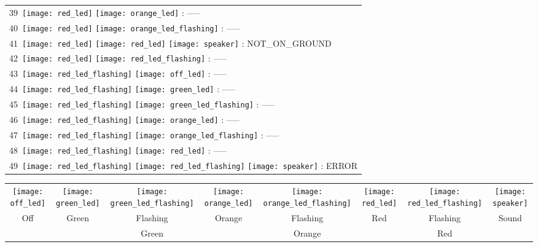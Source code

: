 \documentclass[12pt, a4paper]{report}
\begin{document}
\begin{minipage}{0.45\textwidth}
\begin{Large}
\begin{tabular}{l}
		39\  \texttt{[image: red\_led]} \texttt{[image: orange\_led]} : -----\\
		
		40\  \texttt{[image: red\_led]} \texttt{[image: orange\_led\_flashing]} : -----\\
		
		41\  \texttt{[image: red\_led]} \texttt{[image: red\_led]} \texttt{[image: speaker]} : NOT\_ON\_GROUND\\
		
		42\  \texttt{[image: red\_led]} \texttt{[image: red\_led\_flashing]} : -----\\
		
		43\  \texttt{[image: red\_led\_flashing]} \texttt{[image: off\_led]} : -----\\
		
		44\  \texttt{[image: red\_led\_flashing]} \texttt{[image: green\_led]} : -----\\
		
		45\  \texttt{[image: red\_led\_flashing]} \texttt{[image: green\_led\_flashing]} : -----\\
	
		46\  \texttt{[image: red\_led\_flashing]} \texttt{[image: orange\_led]} : -----\\
		
		47\  \texttt{[image: red\_led\_flashing]} \texttt{[image: orange\_led\_flashing]} : -----\\
		
		48\  \texttt{[image: red\_led\_flashing]} \texttt{[image: red\_led]} : -----\\
		
		49\  \texttt{[image: red\_led\_flashing]} \texttt{[image: red\_led\_flashing]} \texttt{[image: speaker]} : ERROR\\
	\end{tabular}
	\end{Large}
	\end{minipage}%

\vspace{1cm}

\begin{tabular}{c c c c c c c c}
	\texttt{[image: off\_led]} & \texttt{[image: green\_led]} & \texttt{[image: green\_led\_flashing]} & \texttt{[image: orange\_led]} & \texttt{[image: orange\_led\_flashing]} & \texttt{[image: red\_led]} & \texttt{[image: red\_led\_flashing]} &
	\texttt{[image: speaker]} \\
	Off & Green & Flashing & Orange & Flashing & Red & Flashing & Sound\\
	&& Green && Orange && Red & \\

\end{tabular}
\end{document}
